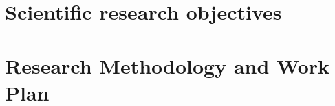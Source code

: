 \documentclass[11pt]{article}
\begin{document}
\section*{Scientific research objectives}


\section*{Research Methodology and Work Plan}





\end{document}
